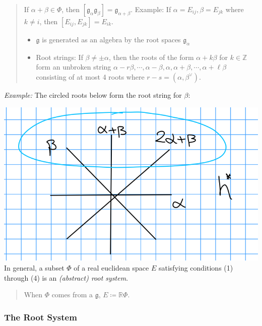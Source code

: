 \documentclass[11pt]{scrartcl}
\theoremstyle{definition}
\theoremstyle{theorem}
\theoremstyle{proof}
\theoremstyle{definition}
\theoremstyle{break}
\theoremstyle{problem}
\providecommand{\tightlist}{%
  \setlength{\itemsep}{0pt}\setlength{\parskip}{0pt}}
\newcommand{\RR}[0]{{\mathbb{R}}}
\newcommand{\ZZ}[0]{{\mathbb{Z}}}
\newcommand{\definedas}[0]{\coloneqq}
\newcommand{\dual}[0]{^\vee}
\newcommand{\lieg}[0]{{\mathfrak{g}}}
\begin{document}
\begin{quote}
If \(\alpha + \beta \in \Phi\), then
\([\lieg_\alpha \lieg_\beta] = \lieg_{\alpha+\beta}\). Example: If
\(\alpha = E_{ij}, \beta = E_{jk}\) where \(k\neq i\), then
\([E_{ij}, E_{jk}]= E_{ik}\).

\begin{itemize}
\tightlist
\item
  \(\lieg\) is generated as an algebra by the root spaces
  \(\lieg_\alpha\)
\item
  Root strings: If \(\beta \neq \pm\alpha\), then the roots of the form
  \(\alpha + k\beta\) for \(k\in \ZZ\) form an unbroken string
  \(\alpha - r\beta, \cdots, \alpha-\beta, \alpha,\alpha+\beta,\cdots,\alpha + \ell \beta\)
  consisting of at most 4 roots where \(r-s = (\alpha, \beta\dual)\).
\end{itemize}
\end{quote}

\emph{Example:} The circled roots below form the root string for
\(\beta\):

\includegraphics{figures/2020-01-10-09:34.png}\\

In general, a subset \(\Phi\) of a real euclidean space \(E\) satisfying
conditions (1) through (4) is an \emph{(abstract) root system}.

\begin{quote}
When \(\Phi\) comes from a \(\lieg\), \(E\definedas \RR \Phi\).
\end{quote}

\hypertarget{the-root-system}{%
\subsubsection{The Root System}\label{the-root-system}}
\end{document}
